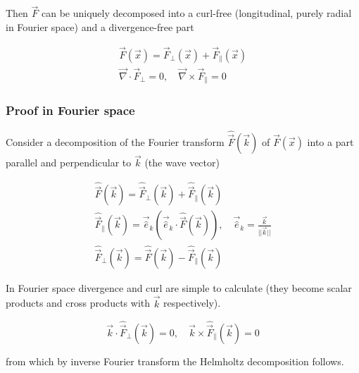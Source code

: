 Then $\vec{F}$ can be uniquely decomposed into a curl-free (longitudinal, purely radial in Fourier space) and a divergence-free part

\begin{equation}
    \begin{gathered}
        \vec{F}(\vec{x}) = \vec{F}_\perp(\vec{x}) + \vec{F}_\parallel(\vec{x}) \\
        \vec{\nabla} \cdot \vec{F}_\perp = 0, \quad \vec{\nabla} \times \vec{F}_\parallel = 0
    \end{gathered}
\end{equation}

\subsubsection{Proof in Fourier space}
Consider a decomposition of the Fourier transform $\hat{\vec{F}}(\vec{k})$ of $\vec{F}(\vec{x})$ into a part parallel
and perpendicular to $\vec{k}$ (the wave vector)

\begin{equation}
    \begin{gathered}
        \hat{\vec{F}}(\vec{k}) = \hat{\vec{F}}_\perp(\vec{k}) + \hat{\vec{F}}_\parallel(\vec{k}) \\
        \hat{\vec{F}}_\parallel(\vec{k}) = \vec{\hat{e}}_k \left( \vec{\hat{e}}_k \cdot \hat{\vec{F}}(\vec{k}) \right), \quad \vec{\hat{e}}_k = \frac{\vec{k}}{||\vec{k}||}  \\
        \hat{\vec{F}}_\perp(\vec{k}) = \hat{\vec{F}}(\vec{k}) - \hat{\vec{F}}_\parallel(\vec{k})
    \end{gathered}
\end{equation}

In Fourier space divergence and curl are simple to calculate (they become scalar products and cross products with $\vec{k}$ respectively).

\begin{equation}
    \vec{k} \cdot \hat{\vec{F}}_\perp(\vec{k}) = 0, \quad \vec{k} \times \hat{\vec{F}}_\parallel(\vec{k}) = 0
\end{equation}

from which by inverse Fourier transform the Helmholtz decomposition follows.

